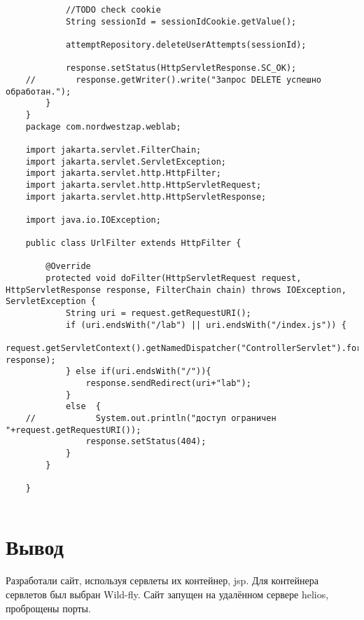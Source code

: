 \documentclass{article}
\begin{document}
\begin{verbatim}
            //TODO check cookie
            String sessionId = sessionIdCookie.getValue();
    
            attemptRepository.deleteUserAttempts(sessionId);
    
            response.setStatus(HttpServletResponse.SC_OK);
    //        response.getWriter().write("Запрос DELETE успешно обработан.");
        }
    }
    package com.nordwestzap.weblab;

    import jakarta.servlet.FilterChain;
    import jakarta.servlet.ServletException;
    import jakarta.servlet.http.HttpFilter;
    import jakarta.servlet.http.HttpServletRequest;
    import jakarta.servlet.http.HttpServletResponse;
    
    import java.io.IOException;
    
    public class UrlFilter extends HttpFilter {
    
        @Override
        protected void doFilter(HttpServletRequest request, HttpServletResponse response, FilterChain chain) throws IOException, ServletException {
            String uri = request.getRequestURI();
            if (uri.endsWith("/lab") || uri.endsWith("/index.js")) {
                request.getServletContext().getNamedDispatcher("ControllerServlet").forward(request, response);
            } else if(uri.endsWith("/")){
                response.sendRedirect(uri+"lab");
            }
            else  {
    //            System.out.println("доступ ограничен "+request.getRequestURI());
                response.setStatus(404);
            }
        }
    
    }
                   
\end{verbatim}
\section{Вывод}
Разработали сайт, используя сервлеты их контейнер, jsp. Для контейнера сервлетов был выбран Wild-fly. Сайт запущен на удалённом сервере helios, проброщены порты.
\end{document}
